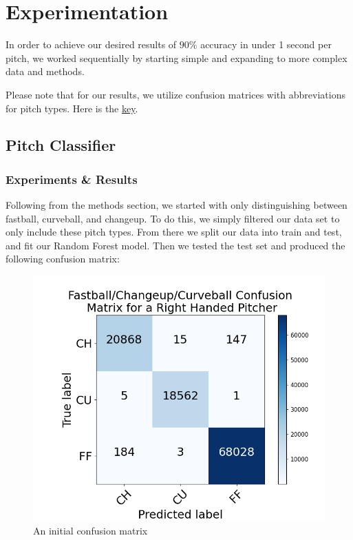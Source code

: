 \documentclass{article}
\begin{document}
\section{Experimentation}
\label{results}

In order to achieve our desired results of $90\%$ accuracy in under 1 second
per pitch, we worked sequentially by starting simple and expanding to more complex 
data and methods. 

Please note that for our results, we utilize confusion matrices with abbreviations 
for pitch types. Here is the \hyperref[key]{key}.

\subsection{Pitch Classifier}

\subsubsection{Experiments \& Results}
Following from the methods section,
we started with only distinguishing between fastball, curveball, and changeup. To do this,
we simply filtered our data set to only include these pitch types. From there we split
our data into train and test, and fit our Random Forest model. Then we tested the test set
and produced the following confusion matrix:

\vspace{-.1in}

\begin{center}
  \begin{figure} [!ht]
    \includegraphics[scale = .22]{FCCR-R.png}
    \caption{An initial confusion matrix}
    \vspace{-.3in}
  \end{figure}
\end{center}
\end{document}

